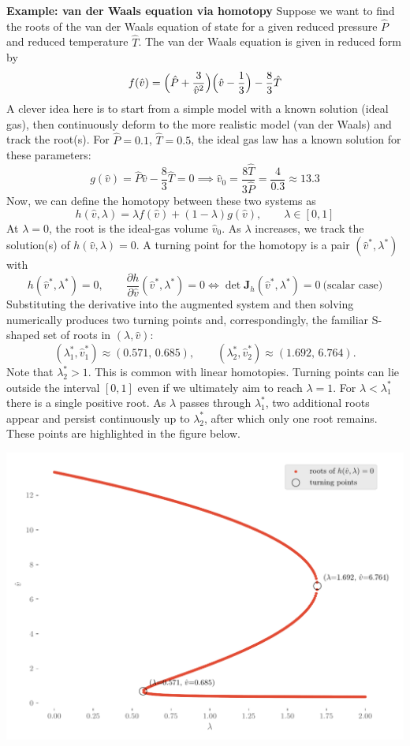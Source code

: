 \begin{exampleBox}
    \textbf{Example: van der Waals equation via homotopy}
    Suppose we want to find the roots of the van der Waals equation of state for a given reduced pressure $\hat{P}$ and reduced temperature $\hat{T}$. The van der Waals equation is given in reduced form by
    \[
    f(\hat v)=\Bigl(\hat P+\frac{3}{\hat v^2}\Bigr)\Bigl(\hat v-\frac{1}{3}\Bigr)-\frac{8}{3}\hat T
    \]
    A clever idea here is to start from a simple model with a known solution (ideal gas), then continuously deform to the more realistic model (van der Waals) and track the root(s). For \(\hat P=0.1\), \(\hat T=0.5\), the ideal gas law has a known solution for these parameters:
    \[
    g(\hat v)=\hat P \hat v-\frac{8}{3}\hat T = 0
    \implies
    \hat v_0=\frac{8\hat T}{3\hat P}=\frac{4}{0.3} \approx 13.3
    \]
    Now, we can define the homotopy between these two systems as
    \[
    h(\hat v,\lambda)=\lambda f(\hat v)+(1-\lambda)g(\hat v),\qquad \lambda\in[0,1]
    \]
    At \(\lambda=0\), the root is the ideal-gas volume \(\hat v_0\). As \(\lambda\) increases, we track the solution(s) of \(h(\hat v,\lambda)=0\). A turning point for the homotopy is a pair $(\hat v^*,\lambda^*)$ with
    \[
    h(\hat v^*,\lambda^*)=0,
    \qquad
    \frac{\partial h}{\partial \hat v}(\hat v^*,\lambda^*)=0
    \iff
    \det \mathbf{J}_h(\hat v^*,\lambda^*)=0\ \text{(scalar case)}
    \]
    Substituting the derivative into the augmented system and then solving numerically produces two turning points and, correspondingly, the familiar S-shaped set of roots in $(\lambda,\hat v)$:
    \[
    (\lambda^*_1,\hat v^*_1)\approx(0.571,\,0.685),
    \qquad
    (\lambda^*_2,\hat v^*_2)\approx(1.692,\,6.764).
    \]
    Note that \(\lambda_2^*>1\). This is common with linear homotopies. Turning points can lie outside the interval \([0,1]\) even if we ultimately aim to reach \(\lambda=1\). For $\lambda<\lambda_1^*$ there is a single positive root. As $\lambda$ passes through $\lambda_1^*$, two additional roots appear and persist continuously up to $\lambda_2^*$, after which only one root remains. These points are highlighted in the figure below.
    \begin{center}
    \includegraphics[width=0.80\linewidth]{figs/nle/vdw_homotopy_branches.pdf}
    \end{center}
\end{exampleBox}


